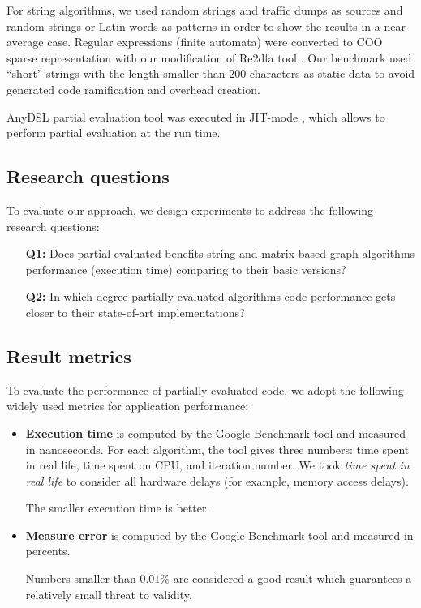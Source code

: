 \documentclass[conference]{IEEEtran}
\begin{document}
For string algorithms, we used random strings and traffic dumps as sources and random strings or Latin words as patterns in order to show the results in a near-average case. Regular expressions (finite automata) were converted to COO sparse representation with our modification of Re2dfa tool \cite{re2dfa}. Our benchmark used ``short'' strings with the length smaller than 200 characters as static data to avoid generated code ramification and overhead creation.

AnyDSL partial evaluation tool was executed in JIT-mode \colorbox{red}{\cite{leissa2018anydsl}}, which allows to perform partial evaluation at the run time.



\subsection{Research questions}

To evaluate our approach, we design experiments to address the following research questions:

\begin{itemize}
	\item[\textbf{Q1:}] Does partial evaluated benefits string and matrix-based graph algorithms performance (execution time) comparing to their basic versions?
	\item[\textbf{Q2:}] In which degree partially evaluated algorithms code performance gets closer to their state-of-art implementations?
\end{itemize}

\subsection{Result metrics}
To evaluate the performance of partially evaluated code, we adopt the following widely used metrics for application performance:
\begin{itemize}
	\item \textbf{Execution time} is computed by the Google Benchmark tool and measured in nanoseconds. For each algorithm, the tool gives three numbers: time spent in real life, time spent on CPU, and iteration number. We took \textit{time spent in real life} to consider all hardware delays (for example, memory access delays).
	
	The smaller execution time is better.
	
	\item \textbf{Measure error} is computed by the Google Benchmark tool and measured in percents. 
	
	Numbers smaller than $0.01\%$ are considered a good result which guarantees a relatively small threat to validity.

\end{itemize}
\end{document}
